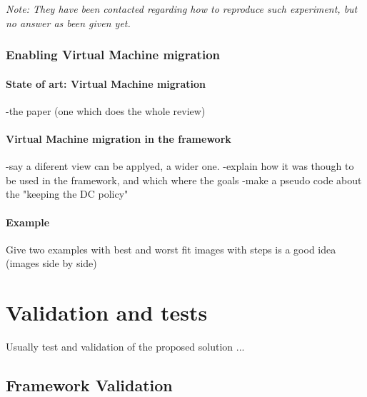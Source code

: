 \documentclass[12pt,english,oneside]{book}
\begin{document}
\textit{Note: They have been contacted regarding how to reproduce such experiment, but no answer as been given yet.}

\newpage

\subsection{Enabling Virtual Machine migration}
\subsubsection{State of art: Virtual Machine migration}
-the paper (one which does the whole review)
\subsubsection{Virtual Machine migration in the framework}
-say a diferent view can be applyed, a wider one.
-explain how it was though to be used in the framework, and which where the goals
-make a pseudo code about the "keeping the DC policy"

\subsubsection{Example}

Give two examples with best and worst fit
images with steps is a good idea (images side by side)

\chapter{Validation and tests \label{cha:valtes} }

Usually test and validation of the proposed solution ...

\section{Framework Validation}
\end{document}
